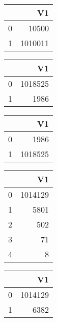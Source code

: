 \bigskip\bigskip
\centering
\begin{tabular}{rr}
  \hline
 & V1 \\ 
  \hline
0 & 10500 \\ 
  1 & 1010011 \\ 
   \hline
\end{tabular}

\bigskip\bigskip
\centering
\begin{tabular}{rr}
  \hline
 & V1 \\ 
  \hline
0 & 1018525 \\ 
  1 & 1986 \\ 
   \hline
\end{tabular}

\bigskip\bigskip
\centering
\begin{tabular}{rr}
  \hline
 & V1 \\ 
  \hline
0 & 1986 \\ 
  1 & 1018525 \\ 
   \hline
\end{tabular}

\bigskip\bigskip
\centering
\begin{tabular}{rr}
  \hline
 & V1 \\ 
  \hline
0 & 1014129 \\ 
  1 & 5801 \\ 
  2 & 502 \\ 
  3 &  71 \\ 
  4 &   8 \\ 
   \hline
\end{tabular}

\bigskip\bigskip
\centering
\begin{tabular}{rr}
  \hline
 & V1 \\ 
  \hline
0 & 1014129 \\ 
  1 & 6382 \\ 
   \hline
\end{tabular}

